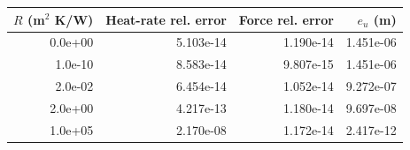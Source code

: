 \begin{center}\small
\begin{tabular}{rrrr}\toprule
$R$ (m$^2$ K/W) & Heat-rate rel. error & Force rel. error & $e_u$ (m)\\\midrule
0.0e+00 & 5.103e-14 & 1.190e-14 & 1.451e-06\\
1.0e-10 & 8.583e-14 & 9.807e-15 & 1.451e-06\\
2.0e-02 & 6.454e-14 & 1.052e-14 & 9.272e-07\\
2.0e+00 & 4.217e-13 & 1.180e-14 & 9.697e-08\\
1.0e+05 & 2.170e-08 & 1.172e-14 & 2.417e-12\\
\bottomrule\end{tabular}
\end{center}
